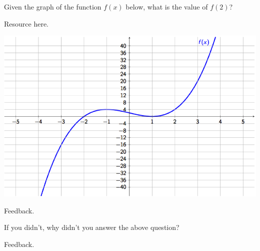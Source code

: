 \documentclass{ximera}
\begin{document}
\begin{problem} 
    Given the graph of the function $f(x)$ below, what is the value of $f(2)$?
    
    \begin{hint}
    Resource here.
    \end{hint}
    
\begin{center} \includegraphics[scale=0.7]{Graphing1.png} \end{center}
  \begin{multipleChoice}
      
      \begin{feedback}[attempt]
      Feedback.
      \end{feedback}
      
  \end{multipleChoice}
  
\begin{question}
  
  If you didn't, why didn't you answer the above question?
  
  \begin{multipleChoice}
      
      \begin{feedback}[attempt]
      Feedback.
      \end{feedback}
      
  \end{multipleChoice}
  
\end{question}
  
  
\end{problem}
\end{document}

